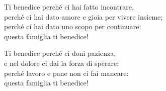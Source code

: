 
 

\spazio

\strofa Ti benedice perché ci hai fatto incontrare,\\
perché ci hai dato amore e gioia per vivere insieme;\\
perché ci hai dato uno scopo per continuare:\\
questa famiglia ti benedice!

\spazio


\spazio

\strofa Ti benedice perché ci doni pazienza,\\
e nel dolore ci dai la forza di sperare;\\
perché lavoro e pane non ci fai mancare:\\
questa famiglia ti benedice!

\spazio

